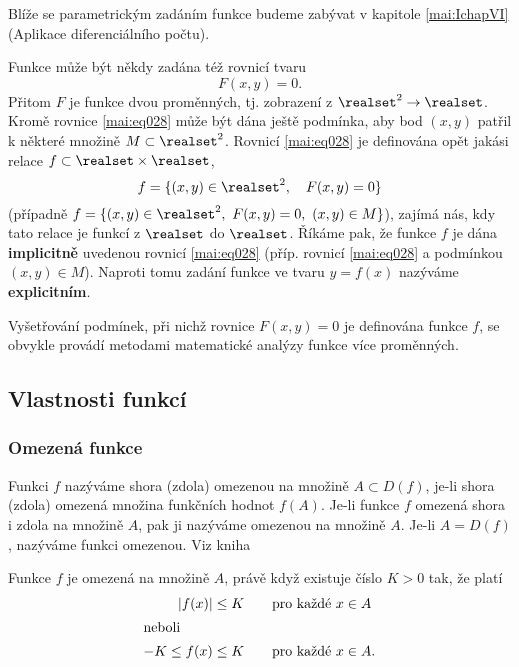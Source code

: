         
      
      Blíže se parametrickým zadáním funkce budeme zabývat v kapitole \ref{mai:IchapVI}
      (Aplikace diferenciálního počtu).
      
      Funkce může být někdy zadána též rovnicí tvaru 
      \begin{equation}\label{mai:eq028}
        F(x,y) = 0.
      \end{equation}
      Přitom $F$ je funkce dvou proměnných, tj. zobrazení z $\realset^2\rightarrow\realset$. Kromě 
      rovnice \ref{mai:eq028} může být dána ještě podmínka, aby bod $(x,y)$ patřil k některé 
      množině $M\subset\realset^2$. Rovnicí \ref{mai:eq028} je definována opět jakási relace 
      $f\subset\realset\times\realset$,
      \begin{equation}
        f = \{(x,y)\in\realset^2,\quad F(x,y)=0 \}
      \end{equation}
      (případně $f = \{(x,y)\in\realset^2,\ F(x,y)=0,\ (x,y)\in M \}$), zajímá nás, kdy tato relace 
      je funkcí z $\realset$ do $\realset$. Říkáme pak, že funkce $f$ je dána \textbf{implicitně} 
      uvedenou rovnicí \ref{mai:eq028} (příp. rovnicí \ref{mai:eq028} a podmínkou $(x,y)\in 
      M$). Naproti tomu zadání funkce ve tvaru $y=f(x)$ nazýváme \textbf{explicitním}.

        
      
      Vyšetřování podmínek, při nichž rovnice $F(x,y)=0$ je definována funkce $f$, se obvykle 
      provádí metodami matematické analýzy funkce více proměnných. 
          
    \subsection{Vlastnosti funkcí}\label{mai:IchapIIIsecIssecIII}
      \subsubsection{Omezená funkce}
        \begin{definition}\label{MA1:def_lim01}
          Funkci $f$ nazýváme shora (zdola) omezenou na množině $A\subset D(f)$, je-li shora 
          (zdola) omezená množina funkčních hodnot $f(A)$. Je-li funkce $f$ omezená shora i zdola 
          na množině $A$, pak ji nazýváme omezenou na množině $A$. Je-li $A=D(f)$, nazýváme funkci 
          omezenou. Viz kniha \cite[s.~87]{Brabec1989}       
        \end{definition}
        Funkce \(f\) je omezená na množině \(A\), právě když existuje číslo \(K>0\) tak, že platí
        \begin{align*}
         \lvert f(x)\rvert  &\leq K \qquad \text{pro každé } x\in A   \\ 
         \shortintertext{neboli}
         -K\leq f(x) &\leq K \qquad \text{pro každé } x\in A. 
        \end{align*}

